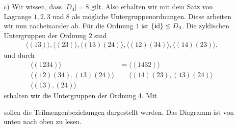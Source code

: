 \begin{loes}
\begin{enumerate}
		\item[c)] 
		Wir wissen, dass $ |D_4 | = 8  $ gilt. Also erhalten wir mit dem Satz von Lagrange
		$ 1 ,2 ,3 $ und $ 8 $ als mögliche Untergruppenordnungen.
		Diese arbeiten wir nun nacheinander ab.
		Für die Ordnung $ 1 $ ist $ \lbrace \operatorname{id} \rbrace \leq D_4 $.
		Die zyklischen Untergruppen der Ordnung $ 2 $ sind
		\begin{align*}
		\langle (13) \rangle ,\langle(23) \rangle, \langle (13)(24) \rangle, \langle (12)(34) \rangle,
		\langle (14)(23) \rangle.
		\end{align*}
		und durch 
		\begin{align*}
		\langle (1234) \rangle &= \langle (1432) \rangle\\
		\langle (12)(34),(13)(24) \rangle &= \langle (14)(23), (13)(24) \rangle\\
		\langle (13),(24) \rangle &
		\end{align*}
		erhalten wir die Untergruppen der Ordnung 4.
		Mit
		\begin{figure}[H]
			\centering
		\end{figure}
		sollen die Teilmengenbeziehungen dargestellt werden. Das Diagramm ist von unten nach oben zu lesen.
	\end{enumerate}
\end{loes}

